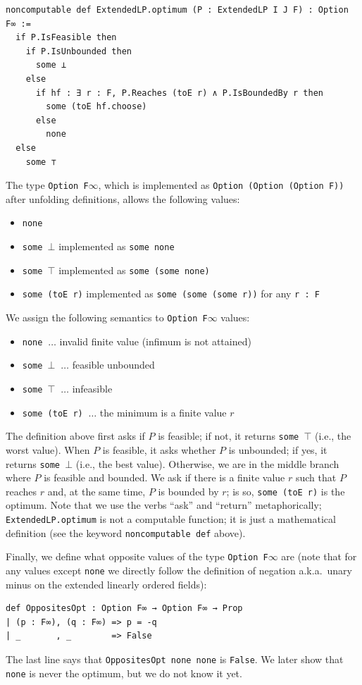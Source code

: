 \documentclass[]{article}
\renewcommand{\.}{\hskip .75pt}
\begin{document}
\begin{lstlisting}
noncomputable def ExtendedLP.optimum (P : ExtendedLP I J F) : Option F∞ :=
  if P.IsFeasible then
    if P.IsUnbounded then
      some ⊥ 
    else
      if hf : ∃ r : F, P.Reaches (toE r) ∧ P.IsBoundedBy r then
        some (toE hf.choose)
      else
        none
  else
    some ⊤
\end{lstlisting}
The type \texttt{Option F$\infty$}, which is implemented as
\texttt{Option (Option (Option F))} after unfolding definitions,
allows the following values:
\begin{itemize}
\item \texttt{none}
\item \texttt{some $\bot$} implemented as \texttt{some none}
\item \texttt{some $\top$} implemented as \texttt{some (some none)}
\item \texttt{some (toE r)} implemented as \texttt{some (some (some r))} for any \texttt{r :~F}
\end{itemize}
We assign the following semantics to \texttt{Option F$\infty$} values:
\begin{itemize}
\item \texttt{none} $\ \dots$ invalid finite value (infimum is not attained)
\item \texttt{some $\bot$} $\ \dots$ feasible unbounded
\item \texttt{some $\top$} $\ \dots$ infeasible
\item \texttt{some (toE r)} $\ \dots$ the minimum is a finite value $r$
\end{itemize}
The definition above first asks if $P$ is feasible; if not, it returns \texttt{some $\top$}
(i.e., the worst value).
When $P$ is feasible, it asks whether $P$ is unbounded; if yes, it returns \texttt{some $\bot$}
(i.e., the best value).
Otherwise, we are in the middle branch where $P$ is feasible and bounded.
We ask if there is a finite value $r$ such that $P$ reaches $r$ and, at the same time,
$P$ is bounded by $r$; is so, \texttt{some (toE r)} is the optimum.
Note that we use the verbs ``ask'' and ``return'' metaphorically;
\texttt{ExtendedLP.optimum} is not a computable function; it is just a mathematical
definition (see the keyword \texttt{noncomputable def} above).

Finally, we define what opposite values of the type \texttt{Option F$\infty$} are
(note that for any values except \texttt{none} we directly follow the definition
of negation a.k.a.\ unary minus on the extended linearly ordered fields):
\begin{lstlisting}
def OppositesOpt : Option F∞ → Option F∞ → Prop
| (p : F∞), (q : F∞) => p = -q
| _       , _        => False
\end{lstlisting}
The last line says that \texttt{OppositesOpt none none} is \texttt{False}.
We later show that \texttt{none} is never the optimum, but we do not know it yet.
\end{document}
